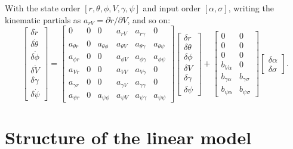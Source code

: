 \documentclass[11pt]{report}
\numberwithin{equation}{chapter}
\begin{document}
With the state order $[r,\theta,\phi,V,\gamma,\psi]$ and input order $[\alpha,\sigma]$,
writing the kinematic partials as $a_{r V}=\partial\dot r/\partial V$, and so on:
\begin{equation}
\begin{bmatrix}\delta\dot r\\ \delta\dot\theta\\ \delta\dot\phi\\ \delta\dot V\\ \delta\dot\gamma\\ \delta\dot\psi\end{bmatrix}
=
\begin{bmatrix}
0 & 0 & 0 & a_{rV} & a_{r\gamma} & 0\\
a_{\theta r} & 0 & a_{\theta\phi} & a_{\theta V} & a_{\theta\gamma} & a_{\theta\psi}\\
a_{\phi r} & 0 & 0 & a_{\phi V} & a_{\phi\gamma} & a_{\phi\psi}\\
a_{Vr} & 0 & 0 & a_{VV} & a_{V\gamma} & 0\\
a_{\gamma r} & 0 & 0 & a_{\gamma V} & a_{\gamma\gamma} & 0\\
a_{\psi r} & 0 & a_{\psi\phi} & a_{\psi V} & a_{\psi\gamma} & a_{\psi\psi}
\end{bmatrix}
\begin{bmatrix}\delta r\\ \delta\theta\\ \delta\phi\\ \delta V\\ \delta\gamma\\ \delta\psi\end{bmatrix}
+
\begin{bmatrix}
0 & 0\\ 0 & 0\\ 0 & 0\\ b_{V\alpha} & 0\\ b_{\gamma\alpha} & b_{\gamma\sigma}\\ b_{\psi\alpha} & b_{\psi\sigma}
\end{bmatrix}
\begin{bmatrix}\delta\alpha\\ \delta\sigma\end{bmatrix}.
\label{eq:linmodel}
\end{equation}

\section{Structure of the linear model}
\end{document}
